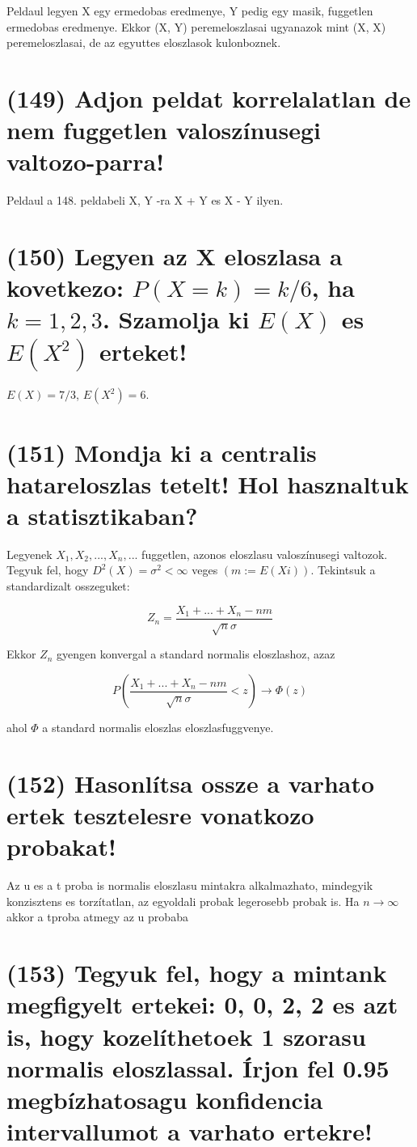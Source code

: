 \documentclass[12p]{article}
\begin{document}
Peldaul legyen X egy ermedobas eredmenye, Y pedig egy masik, fuggetlen ermedobas eredmenye. Ekkor (X, Y) peremeloszlasai ugyanazok mint (X, X) peremeloszlasai, de az egyuttes eloszlasok kulonboznek.

\section{(149) Adjon peldat korrelalatlan de nem fuggetlen valoszínusegi valtozo-parra!}

Peldaul a 148. peldabeli X, Y -ra X + Y es X - Y ilyen.

\section{(150) Legyen az X eloszlasa a kovetkezo: $P(X = k) = k/6$, ha $k = 1, 2, 3$. Szamolja ki $E(X)$ es $E(X^2)$ erteket!}

$E(X) = 7/3$, $E(X^2) = 6$.

\section{(151) Mondja ki a centralis hatareloszlas tetelt! Hol hasznaltuk a statisztikaban?}

Legyenek $X_1 , X_2 ,..., X_n ,...$ fuggetlen, azonos eloszlasu valoszínusegi valtozok. Tegyuk fel, hogy $D^2(X) = \sigma^2 < \infty$ veges $(m:=E(Xi))$. Tekintsuk a standardizalt osszeguket:

$$Z_n = \frac{X_1 + ... + X_n -nm}{\sqrt{n}\sigma}$$

Ekkor $Z_n$ gyengen konvergal a standard normalis eloszlashoz,
azaz

$$P(\frac{X_1 + ... + X_n - nm}{\sqrt{n}\sigma} < z) \rightarrow \Phi(z)$$

ahol $\Phi$ a standard normalis eloszlas eloszlasfuggvenye.

\section{(152) Hasonlítsa ossze a varhato ertek tesztelesre vonatkozo probakat!}

Az u es a t proba is normalis eloszlasu mintakra alkalmazhato, mindegyik konzisztens es torzítatlan, az egyoldali probak legerosebb probak is. Ha $n \rightarrow \infty$ akkor a tproba atmegy az u probaba

\section{(153) Tegyuk fel, hogy a mintank megfigyelt ertekei: 0, 0, 2, 2 es azt is, hogy kozelíthetoek 1 szorasu normalis eloszlassal. Írjon fel 0.95 megbízhatosagu konfidencia intervallumot a varhato ertekre!}
\end{document}
